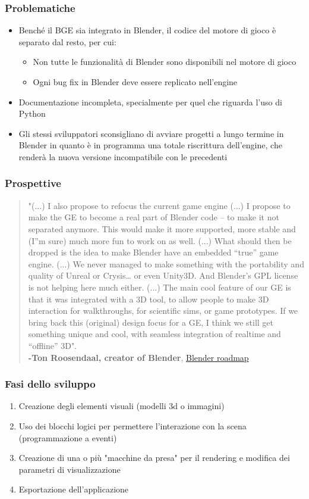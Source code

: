 \documentclass{beamer}
\begin{document}
		\begin{frame}
			\frametitle{Problematiche}
			\begin{itemize}
				\item Benché il BGE sia integrato in Blender, il codice del motore di gioco è separato dal resto, per cui:
				\begin{itemize}
					\item Non tutte le funzionalità di Blender sono disponibili nel motore di gioco
					\item Ogni bug fix in Blender deve essere replicato nell'engine
				\end{itemize}
				\item Documentazione incompleta, specialmente per quel che riguarda l'uso di Python
				\item Gli stessi sviluppatori sconsigliano di avviare progetti a lungo termine in Blender in quanto è in programma una totale riscrittura dell'engine, che renderà la nuova versione incompatibile con le precedenti
			\end{itemize}
		\end{frame}
		\begin{frame}
			\frametitle{Prospettive}
			\begin{quotation}\small 
				"(...) I also propose to refocus the current game engine (...) I propose to make the GE to become a real part of Blender code – to make it not separated anymore. This would make it more supported, more stable and (I”m sure) much more fun to work on as well. (...) What should then be dropped is the idea to make Blender have an embedded “true” game engine. (...) We never managed to make something with the portability and quality of Unreal or Crysis… or even Unity3D. And Blender's GPL license is not helping here much either. (...) The main cool feature of our GE is that it was integrated with a 3D tool, to allow people to make 3D interaction for walkthroughs, for scientific sims, or game prototypes. If we bring back this (original) design focus for a GE, I think we still get something unique and cool, with seamless integration of realtime and “offline” 3D". 
				\\ \textcolor{BlenderOrange}{\textbf{-Ton Roosendaal, creator of Blender}, \href{https://code.blender.org/2013/06/blender-roadmap-2-7-2-8-and-beyond/}{Blender roadmap}} 
			\end{quotation} 
		\end{frame}
		\begin{frame}
			\frametitle{Fasi dello sviluppo}
			\begin{enumerate}
				\item Creazione degli elementi visuali (modelli 3d o immagini)
				\item Uso dei blocchi logici per permettere l'interazione con la scena (programmazione a eventi)
				\item Creazione di una o più "macchine da presa" per il rendering e modifica dei parametri di visualizzazione
				\item Esportazione dell'applicazione
			\end{enumerate}
		\end{frame}
	
\end{document}
